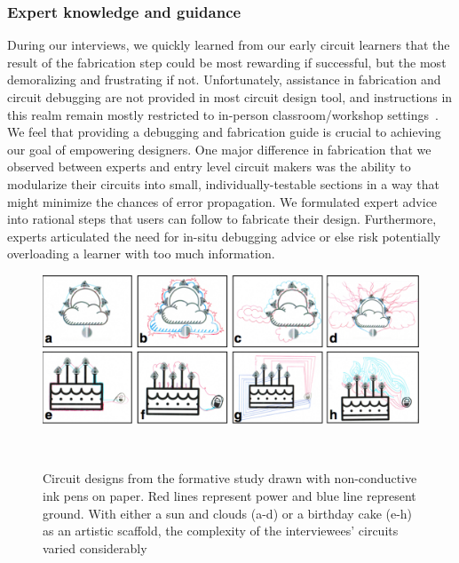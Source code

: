 \documentclass{sigchi}
\begin{document}
\subsubsection{Expert knowledge and guidance}
During our interviews, we quickly learned from our early circuit learners that the result of the fabrication step could be most rewarding if successful, but the most demoralizing and frustrating if not. Unfortunately, assistance in fabrication and circuit debugging are not provided in most circuit design tool, and instructions in this realm remain mostly restricted to in-person classroom/workshop settings~\cite{Klemmer:2004ul}. We feel that providing a debugging and fabrication guide is crucial to achieving our goal of empowering designers. One major difference in fabrication that we observed between experts and entry level circuit makers was the ability to modularize their circuits into small, individually-testable sections in a way that might minimize the chances of error propagation. We formulated expert advice into rational steps that users can follow to fabricate their design. Furthermore, experts articulated the need for in-situ debugging advice or else risk potentially overloading a learner with too much information. 



\begin{figure}
\centering
  \includegraphics[width=1\columnwidth]{figures/Ellustrate_figures_formative_user_design}
  \caption{Circuit designs from the formative study drawn with non-conductive ink pens on paper. Red lines represent power and blue line represent ground. With either a sun and clouds (a-d) or a birthday cake (e-h) as an artistic scaffold, the complexity of the interviewees' circuits varied considerably }~\label{fig:formative_user_design}
  \vspace{-20pt}
\end{figure}
\end{document}
